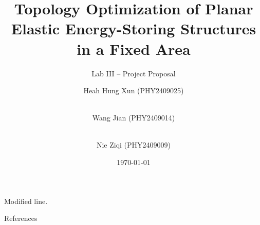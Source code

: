 \documentclass{beamer}
\title{Topology Optimization of Planar Elastic Energy-Storing Structures in a Fixed Area}
\subtitle{Lab III -- Project Proposal}
\author{ Heah Hung Xun (PHY2409025)\and \\ Wang Jian (PHY2409014)\and \\Nie Ziqi (PHY2409009)}
\institute{Xiamen University Malaysia}
\date{\today}
\begin{document}

\maketitle









Modified line.

\begin{frame}[allowframebreaks]{References}
  \printbibliography[heading=none]
\end{frame}
\end{document}
